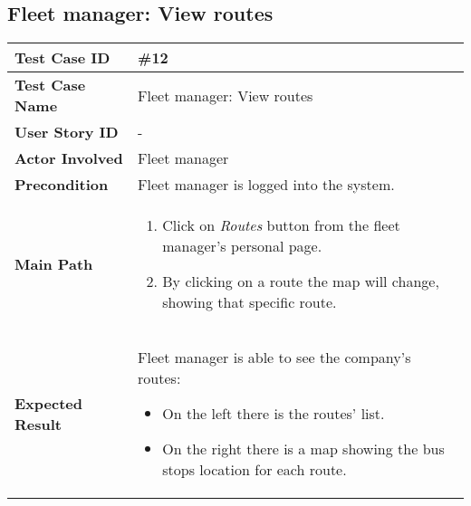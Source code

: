 \subsection{Fleet manager: View routes}
\begin{center}
	\begin{tabular} { | m{3.5cm} | m{9.5cm} | }
		\hline
		\textbf{Test Case ID} & \#12\\
		\hline
		\textbf{Test Case Name} & Fleet manager: View routes \\
		\hline
		\textbf{User Story ID} & - \\
		\hline
		\textbf{Actor Involved} & Fleet manager\\
		\hline
		\textbf{Precondition} & Fleet manager is logged into the system.\\
		\hline
		\textbf{Main Path} & 
		\begin{enumerate}
			\item Click on \textit{Routes} button from the fleet manager's personal page.
			\item By clicking on a route the map will change, showing that specific route.
		\end{enumerate}\\
		\hline
		\textbf{Expected Result} & Fleet manager is able to see the company's routes:
		\begin{itemize}
			\item On the left there is the routes' list.
			\item On the right there is a map showing the bus stops location for each route. 
		\end{itemize}\\
		\hline
	\end{tabular}
\end{center}
\newpage
